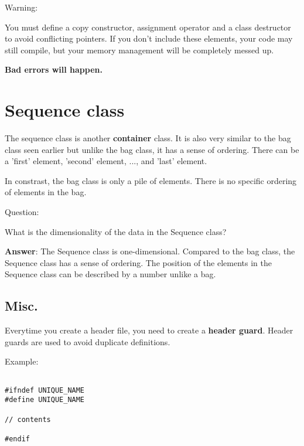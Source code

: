 \documentclass[11pt,a4paper,english]{paper}
\begin{document}
\bigskip

\begin{mybox}{Warning:}{

    You must define a copy constructor, assignment operator and a class destructor to avoid conflicting pointers. If you don’t include these elements, your code may still compile, but your memory management will be completely messed up.

    \bigskip

    \textbf{Bad errors will happen.}
    \bigskip


  }
\end{mybox}

\section{Sequence class}

The sequence class is another \textbf{container} class. It is also very similar to the bag class seen earlier but unlike the bag class, it has a sense of ordering. There can be a 'first' element, 'second' element, ..., and 'last' element.

\bigskip
\noindent In constrast, the bag class is only a pile of elements. There is no specific ordering of elements in the bag.

\bigskip
\begin{gbox}{Question:}{

    What is the dimensionality of the data in the Sequence class?

    \bigskip
    \textbf{Answer}: The Sequence class is one-dimensional. Compared to the bag class, the Sequence class has a sense of ordering. The position of the elements in the Sequence class can be described by a number unlike a bag.

  }

\end{gbox}

\subsection{Misc.}

Everytime you create a header file, you need to create a \textbf{header guard}. Header guards are used to avoid duplicate definitions.

\bigskip

\begin{bluebox}{Example: } {

\begin{verbatim} 

#ifndef UNIQUE_NAME
#define UNIQUE_NAME

// contents

#endif

\end{verbatim}
}
\end{bluebox}
\end{document}
